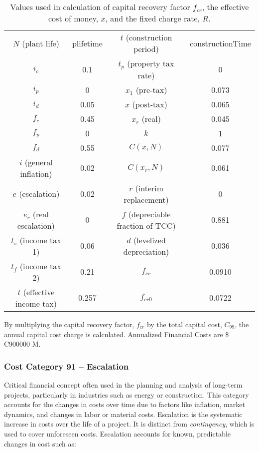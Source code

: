 \begin{table}
    \centering
    \begin{tabular}{cc|cc}
    \hline
      $N$ (plant life)  & plifetime & $t$ (construction period) & constructionTime\\
       $i_c$  & 0.1 & $t_p$ (property tax rate)& 0\\
        $i_p$ & 0 & $x_1$ (pre-tax)& 0.073\\
        $i_d$ & 0.05 & $x$ (post-tax)& 0.065\\
        $f_c$ & 0.45 & $x_r$ (real)& 0.045\\
        $f_p$ & 0 & $k$ & 1\\
        $f_d$ & 0.55 & $C(x,N)$ & 0.077\\
        $i$ (general inflation) & 0.02 & $C(x_r,N)$ & 0.061\\
        $e$  (escalation)& 0.02 & $r$ (interim replacement)& 0\\
        $e_r$ (real escalation) & 0 & $f$ (depreciable fraction of TCC)& 0.881\\
        $t_s$ (income tax 1) & 0.06 & $d$ (levelized depreciation)& 0.036\\
        $t_f$ (income tax 2) & 0.21 & $f_{cr}$ & 0.0910\\
        $t$ (effective income tax) & 0.257 & $f_{cr0}$ & 0.0722\\
    \hline    
    \end{tabular}
    \caption{Values used in calculation of capital recovery factor  $f_{cr}$, the effective cost of money, $x$, and the fixed charge rate, $R$.}
    \label{tab:ec_vals}
    \label{tab:my_label}
\end{table}

By multiplying the capital recovery factor, $f_{cr}$ by the total capital cost, $C_{99}$, the annual capital cost charge is calculated.
Annualized Financial Costs are \$ C900000 M.

\subsubsection*{Cost Category 91 – Escalation}
Critical financial concept often used in the planning and analysis of long-term projects, particularly in industries such as energy or construction. This category accounts for the changes in costs over time due to factors like inflation, market dynamics, and changes in labor or material costs. Escalation is the systematic increase in costs over the life of a project. It is distinct from \textit{contingency}, which is used to cover unforeseen costs. Escalation accounts for known, predictable changes in cost such as:

